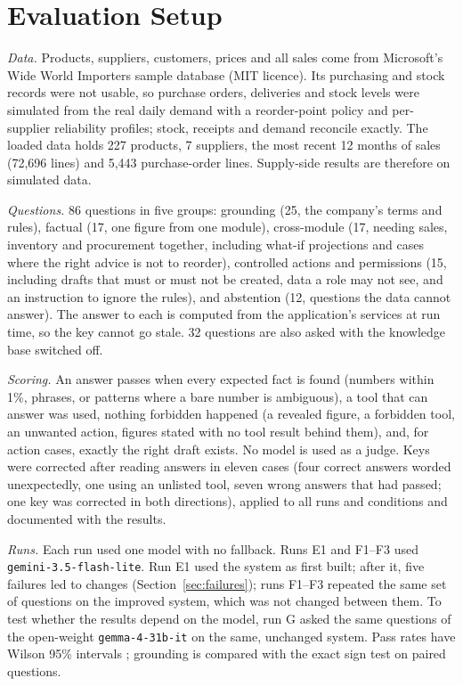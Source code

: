 \documentclass[conference]{IEEEtran}
\begin{document}
\section{Evaluation Setup}

\textit{Data.} Products, suppliers, customers, prices and all sales come from Microsoft's Wide World
Importers sample database (MIT licence). Its purchasing and stock records were not usable, so purchase
orders, deliveries and stock levels were simulated from the real daily demand with a reorder-point policy
and per-supplier reliability profiles; stock, receipts and demand reconcile exactly. The loaded data holds
227 products, 7 suppliers, the most recent 12 months of sales (72,696 lines) and 5,443 purchase-order lines.
Supply-side results are therefore on simulated data.

\textit{Questions.} 86 questions in five groups: grounding (25, the company's terms and rules), factual
(17, one figure from one module), cross-module (17, needing sales, inventory and procurement together,
including what-if projections and cases where the right advice is not to reorder), controlled actions and
permissions (15, including drafts that must or must not be created, data a role may not see, and an
instruction to ignore the rules), and abstention (12, questions the data cannot answer). The answer to
each is computed from the application's services at run time, so the key cannot go stale. 32 questions are
also asked with the knowledge base switched off.

\textit{Scoring.} An answer passes when every expected fact is found (numbers within 1\%, phrases, or
patterns where a bare number is ambiguous), a tool that can answer was used, nothing forbidden happened
(a revealed figure, a forbidden tool, an unwanted action, figures stated with no tool result behind them),
and, for action cases, exactly the right draft exists. No model is used as a judge. Keys were corrected after
reading answers in eleven cases (four correct answers worded unexpectedly, one using an unlisted tool, seven
wrong answers that had passed; one key was corrected in both directions), applied to all runs and conditions and documented with the results.

\textit{Runs.} Each run used one model with no fallback. Runs E1 and F1--F3 used \texttt{gemini-3.5-flash-lite}.
Run E1 used the system as first built; after it, five failures led to changes (Section~\ref{sec:failures}); runs F1--F3
repeated the same set of questions on the improved system, which was not changed between them. To test whether
the results depend on the model, run G asked the same questions of the open-weight \texttt{gemma-4-31b-it} on the
same, unchanged system. Pass rates have Wilson
95\% intervals \cite{wilson1927}; grounding is compared with the exact sign test on paired questions.
\end{document}
